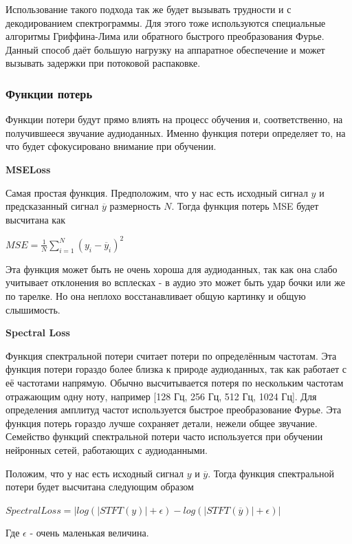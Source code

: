 \documentclass[a4paper, 12pt, oneside]{article}
\begin{document}
Использование такого подхода так же будет вызывать трудности и с декодированием спектрограммы. Для этого тоже используются специальные алгоритмы
Гриффина-Лима или обратного быстрого преобразования Фурье. Данный способ даёт большую нагрузку на аппаратное обеспечение и может вызывать задержки при
потоковой распаковке.

\subsubsection{Функции потерь}

Функции потери будут прямо влиять на процесс обучения и, соответственно, на получившееся звучание аудиоданных.
Именно функция потери определяет то, на что будет сфокусировано внимание при обучении.

\par\textbf{MSELoss}

Самая простая функция. Предположим, что у нас есть исходный сигнал $y$ и предсказанный сигнал $\overline{y}$ размерность $N$. Тогда функция потерь MSE будет высчитана как

$MSE = \frac{1}{N} \sum_{i=1}^{N}(y_i - \overline{y}_i) ^ 2$

Эта функция может быть не очень хороша для аудиоданных, так как она слабо учитывает отклонения во всплесках - в аудио это может быть
удар бочки или же по тарелке. Но она неплохо восстанавливает общую картинку и общую слышимость.

\par\textbf{Spectral Loss}

Функция спектральной потери считает потери по определённым частотам. Эта функция потери гораздо более близка к природе аудиоданных, 
так как работает с её частотами напрямую. Обычно высчитывается потеря по нескольким частотам отражающим одну ноту, например [128 Гц, 256 Гц, 512 Гц, 1024 Гц]. 
Для определения амплитуд частот используется быстрое преобразование Фурье.
Эта функция потерь гораздо лучше сохраняет детали, нежели общее звучание. Семейство функций спектральной потери часто используется при обучении
нейронных сетей, работающих с аудиоданными.

Положим, что у нас есть исходный сигнал $y$ и $\overline{y}$. Тогда функция спектральной потери будет высчитана следующим образом

$SpectralLoss = |log(|STFT(y)| + \epsilon) - log(|STFT(\overline{y})| + \epsilon)|$

Где $\epsilon$ - очень маленькая величина.
\end{document}

